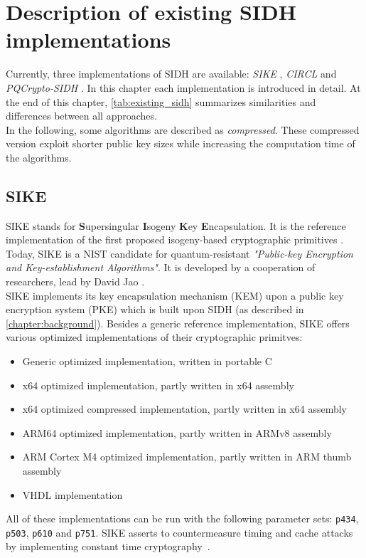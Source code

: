 \chapter{Description of existing \gls{SIDH} implementations}\label{chapter:existing_sidh}
Currently, three implementations of \gls{SIDH} are available: \textit{\gls{SIKE}} \parencite{sike2020spec}, \textit{\gls{CIRCL}} \parencite{circl2020github} and \textit{\gls{PQCrypto-SIDH}} \parencite{microsoft2020sidh}. In this chapter each implementation is introduced in detail. At the end of this chapter, \autoref{tab:existing_sidh} summarizes similarities and differences between all approaches.
\\
In the following, some algorithms are described as \textit{compressed}. These compressed version exploit shorter public key sizes while increasing the computation time of the algorithms.

\section{\gls{SIKE}}
\gls{SIKE} stands for \textbf{S}upersingular \textbf{I}sogeny \textbf{K}ey \textbf{E}ncapsulation. It is the reference implementation of the first proposed isogeny-based cryptographic primitives \parencite{jao2011towards}. Today, \gls{SIKE} is a \gls{NIST} candidate for quantum-resistant \textit{"Public-key Encryption and Key-establishment Algorithms"}. It is developed by a cooperation of researchers, lead by David Jao \parencite{sike2020spec}.
\\
\gls{SIKE} implements its key encapsulation mechanism (\gls{KEM}) upon a public key encryption system (\gls{PKE}) which is built upon \gls{SIDH} (as described in \autoref{chapter:background}). Besides a generic reference implementation, \gls{SIKE} offers various optimized implementations of their cryptographic primitves:
\begin{itemize}
  \item Generic optimized implementation, written in portable C
  \item x64 optimized implementation, partly written in x64 assembly
  \item x64 optimized compressed implementation, partly written in x64 assembly
  \item ARM64 optimized implementation, partly written in ARMv8 assembly
  \item ARM Cortex M4 optimized implementation, partly written in ARM thumb assembly
  \item VHDL implementation
\end{itemize}
All of these implementations can be run with the following parameter sets: \texttt{p434}, \texttt{p503}, \texttt{p610} and \texttt{p751}. \gls{SIKE} asserts to countermeasure timing and cache attacks by implementing constant time cryptography~\parencite{sike2020spec}.
\newpage

